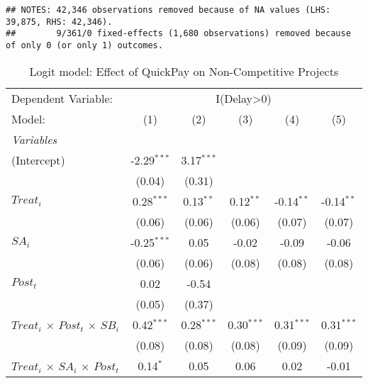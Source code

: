 \documentclass[
]{article}
\begin{document}
\begin{verbatim}
## NOTES: 42,346 observations removed because of NA values (LHS: 39,875, RHS: 42,346).
##        9/361/0 fixed-effects (1,680 observations) removed because of only 0 (or only 1) outcomes.
\end{verbatim}

\begin{table}[htbp]
   \centering
   \caption{Logit model: Effect of QuickPay on Non-Competitive Projects}
   \begin{tabular}{lccccc}
      \tabularnewline\midrule\midrule
      Dependent Variable: & \multicolumn{5}{c}{I(Delay>0)}\\
      Model:                                        & (1)           & (2)          & (3)          & (4)          & (5)\\
      \midrule \emph{Variables} &   &   &   &   &  \\
      (Intercept)                                   & -2.29$^{***}$ & 3.17$^{***}$ &              &              &   \\
                                                    & (0.04)        & (0.31)       &              &              &   \\
      $Treat_i$                                     & 0.28$^{***}$  & 0.13$^{**}$  & 0.12$^{**}$  & -0.14$^{**}$ & -0.14$^{**}$\\
                                                    & (0.06)        & (0.06)       & (0.06)       & (0.07)       & (0.07)\\
      $SA_i$                                        & -0.25$^{***}$ & 0.05         & -0.02        & -0.09        & -0.06\\
                                                    & (0.06)        & (0.06)       & (0.08)       & (0.08)       & (0.08)\\
      $Post_t$                                      & 0.02          & -0.54        &              &              &   \\
                                                    & (0.05)        & (0.37)       &              &              &   \\
      $Treat_i$ $\times$ $Post_t$ $\times$ $SB_i$ & 0.42$^{***}$  & 0.28$^{***}$ & 0.30$^{***}$ & 0.31$^{***}$ & 0.31$^{***}$\\
                                                    & (0.08)        & (0.08)       & (0.08)       & (0.09)       & (0.09)\\
      $Treat_i$ $\times$ $SA_i$ $\times$ $Post_t$ & 0.14$^{*}$    & 0.05         & 0.06         & 0.02         & -0.01\\

\end{tabular}
\end{table}
\end{document}
